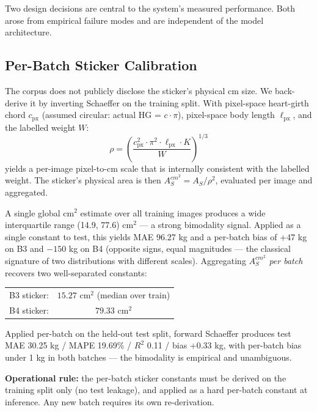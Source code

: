 \documentclass[conference]{IEEEtran}
\begin{document}
Two design decisions are central to the system's measured performance. Both arose from empirical failure modes and are independent of the model architecture.

\subsection{Per-Batch Sticker Calibration}
\label{sec:scale}

The corpus does not publicly disclose the sticker's physical cm size. We back-derive it by inverting Schaeffer on the training split. With pixel-space heart-girth chord $c_{\text{px}}$ (assumed circular: actual HG = $c \cdot \pi$), pixel-space body length $\ell_{\text{px}}$, and the labelled weight $W$:
\begin{equation}
\rho = \left( \frac{c_{\text{px}}^2 \cdot \pi^2 \cdot \ell_{\text{px}} \cdot K}{W} \right)^{1/3}
\label{eq:scale_inversion}
\end{equation}
yields a per-image pixel-to-cm scale that is internally consistent with the labelled weight. The sticker's physical area is then $A_S^{cm^2} = A_S / \rho^2$, evaluated per image and aggregated.

A single global cm$^2$ estimate over all training images produces a wide interquartile range (14.9, 77.6) cm$^2$ --- a strong bimodality signal. Applied as a single constant to test, this yields MAE 96.27 kg and a per-batch bias of +47 kg on B3 and $-150$ kg on B4 (opposite signs, equal magnitudes --- the classical signature of two distributions with different scales). Aggregating $A_S^{cm^2}$ \textit{per batch} recovers two well-separated constants:
\begin{center}
\begin{tabular}{lc}
B3 sticker: & $15.27$ cm$^2$ (median over train) \\
B4 sticker: & $79.33$ cm$^2$ \\
\end{tabular}
\end{center}
Applied per-batch on the held-out test split, forward Schaeffer produces test MAE 30.25 kg / MAPE 19.69\% / $R^2$ 0.11 / bias +0.33 kg, with per-batch bias under 1 kg in both batches --- the bimodality is empirical and unambiguous.

\textbf{Operational rule:} the per-batch sticker constants must be derived on the training split only (no test leakage), and applied as a hard per-batch constant at inference. Any new batch requires its own re-derivation.
\end{document}
